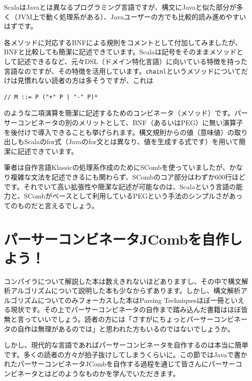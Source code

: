 ScalaはJavaとは異なるプログラミング言語ですが、構文にJavaと似た部分が多く（JVM上で動く処理系がある）、Javaユーザーの方でも比較的読み進めやすいはずです。

各メソッドに対応するBNFによる規則をコメントとして付加してみましたが、BNFと比較しても簡潔に記述できています。Scalaは記号をそのままメソッドとして記述できるなど、元々DSL（ドメイン特化言語）に向いている特徴を持った言語なのですが、その特徴を活用しています。\texttt{chainl}というメソッドについてだけは見慣れない読者の方は多そうですが、これは

\begin{verbatim}
// M ::= P ("+" P | "-" P)*
\end{verbatim}

のような二項演算を簡潔に記述するためのコンビネータ（メソッド）です。パーサーコンビネータの別のメリットとして、BNF（あるいはPEG）に無い演算子を後付けで導入できることも挙げられます。構文規則からの値（意味値）の取り出しもScalaのfor式（Javaのfor文とは異なり、値を生成する式です）を用いて簡潔に記述できています。

筆者は自作言語Klassicの処理系作成のためにSCombを使っていましたが、かなり複雑な文法を記述できるにも関わらず、SCombのコア部分はわずか600行ほどです。それでいて高い拡張性や簡潔な記述が可能なのは、Scalaという言語の能力と、SCombがベースとして利用しているPEGという手法のシンプルさがあってのものだと言えるでしょう。

\hypertarget{chapter6-ux30d1ux30fcux30b5ux30fcux30b3ux30f3ux30d3ux30cdux30fcux30bfjcombux3092ux81eaux4f5cux3057ux3088ux3046}{%
\section{パーサーコンビネータJCombを自作しよう！}\label{chapter6-ux30d1ux30fcux30b5ux30fcux30b3ux30f3ux30d3ux30cdux30fcux30bfjcombux3092ux81eaux4f5cux3057ux3088ux3046}}

コンパイラについて解説した本は数えきれないほどありますし、その中で構文解析アルゴリズムについて説明した本も少なからずあります。しかし、構文解析アルゴリズムについてのみフォーカスした本はParsing Techniquesほぼ一冊といえる現状です。その上でパーサーコンビネータの自作まで踏み込んだ書籍はほぼ皆無と言っていいでしょう。読者の方には「さすがにちょっとパーサーコンビネータの自作は無理があるのでは」と思われた方もいるのではないでしょうか。

しかし、現代的な言語であればパーサーコンビネータを自作するのは本当に簡単です。多くの読者の方々が拍子抜けしてしまうくらいに。この節ではJavaで書かれたパーサーコンビネータJCombを自作する過程を通じて皆さんにパーサーコンビネータとはどのようなものかを学んでいただきます。

